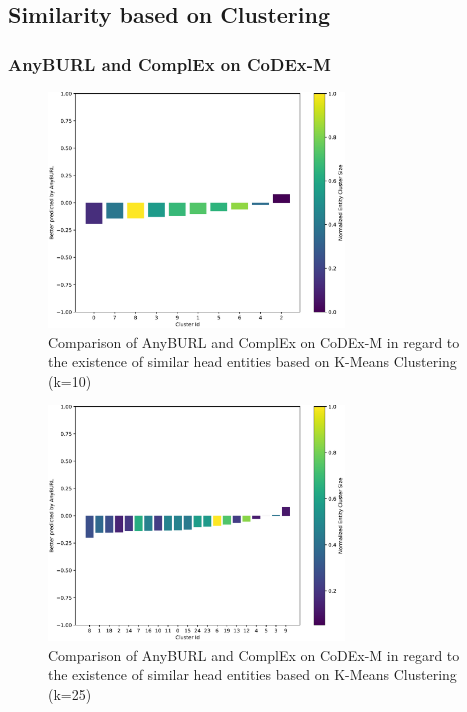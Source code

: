 \subsection{Similarity based on Clustering}

\subsubsection{AnyBURL and ComplEx on CoDEx-M}

\begin{figure}[H]
\centering
\includegraphics[width=0.7\textwidth]{images/head_cluster_10_anyburl_complex_codex.PNG}
\caption{Comparison of AnyBURL and ComplEx on CoDEx-M in regard to the existence of similar head entities based on K-Means Clustering (k=10)}
\label{fig:head_cluster_10_anyburl_complex_codex}
\end{figure}

\begin{figure}[H]
\centering
\includegraphics[width=0.7\textwidth]{images/head_cluster_25_anyburl_complex_codex.PNG}
\caption{Comparison of AnyBURL and ComplEx on CoDEx-M in regard to the existence of similar head entities based on K-Means Clustering (k=25)}
\label{fig:head_cluster_25_anyburl_complex_codex}
\end{figure}

